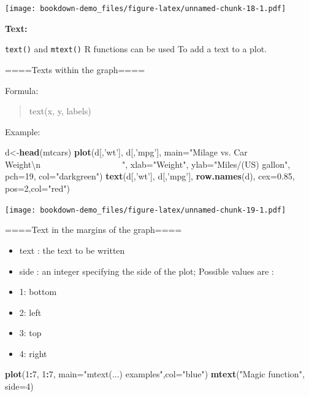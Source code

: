 \documentclass[]{book}
\newenvironment{Shaded}{\begin{snugshade}}{\end{snugshade}}
\newcommand{\KeywordTok}[1]{\textcolor[rgb]{0.13,0.29,0.53}{\textbf{#1}}}
\newcommand{\DataTypeTok}[1]{\textcolor[rgb]{0.13,0.29,0.53}{#1}}
\newcommand{\DecValTok}[1]{\textcolor[rgb]{0.00,0.00,0.81}{#1}}
\newcommand{\FloatTok}[1]{\textcolor[rgb]{0.00,0.00,0.81}{#1}}
\newcommand{\CharTok}[1]{\textcolor[rgb]{0.31,0.60,0.02}{#1}}
\newcommand{\StringTok}[1]{\textcolor[rgb]{0.31,0.60,0.02}{#1}}
\newcommand{\OperatorTok}[1]{\textcolor[rgb]{0.81,0.36,0.00}{\textbf{#1}}}
\newcommand{\NormalTok}[1]{#1}
\providecommand{\tightlist}{%
  \setlength{\itemsep}{0pt}\setlength{\parskip}{0pt}}
\begin{document}
\texttt{[image: bookdown-demo\_files/figure-latex/unnamed-chunk-18-1.pdf]}

\textbf{Text: }

\texttt{text()} and \texttt{mtext()} R functions can be used To add a
text to a plot.

====Texts within the graph====

Formula:

\begin{quote}
text(x, y, labels)
\end{quote}

Example:

\begin{Shaded}
\begin{Highlighting}[]
\NormalTok{d<-}\KeywordTok{head}\NormalTok{(mtcars)}
\KeywordTok{plot}\NormalTok{(d[,}\StringTok{'wt'}\NormalTok{], d[,}\StringTok{'mpg'}\NormalTok{], }
     \DataTypeTok{main=}\StringTok{"Milage vs. Car Weight}\CharTok{\textbackslash{}n}\StringTok{~~~~~~~~~~~~~~~~~~~"}\NormalTok{,}
      \DataTypeTok{xlab=}\StringTok{"Weight"}\NormalTok{, }\DataTypeTok{ylab=}\StringTok{"Miles/(US) gallon"}\NormalTok{,}
      \DataTypeTok{pch=}\DecValTok{19}\NormalTok{, }\DataTypeTok{col=}\StringTok{"darkgreen"}\NormalTok{)}
\KeywordTok{text}\NormalTok{(d[,}\StringTok{'wt'}\NormalTok{], d[,}\StringTok{'mpg'}\NormalTok{],  }\KeywordTok{row.names}\NormalTok{(d),}
     \DataTypeTok{cex=}\FloatTok{0.85}\NormalTok{, }\DataTypeTok{pos=}\DecValTok{2}\NormalTok{,}\DataTypeTok{col=}\StringTok{"red"}\NormalTok{)}
\end{Highlighting}
\end{Shaded}

\texttt{[image: bookdown-demo\_files/figure-latex/unnamed-chunk-19-1.pdf]}

====Text in the margins of the graph====

\begin{itemize}
\tightlist
\item
  text : the text to be written
\item
  side : an integer specifying the side of the plot; Possible values are
  :
\item
  1: bottom
\item
  2: left
\item
  3: top
\item
  4: right
\end{itemize}

\begin{Shaded}
\begin{Highlighting}[]
\KeywordTok{plot}\NormalTok{(}\DecValTok{1}\OperatorTok{:}\DecValTok{7}\NormalTok{, }\DecValTok{1}\OperatorTok{:}\DecValTok{7}\NormalTok{, }
     \DataTypeTok{main=}\StringTok{"mtext(...) examples"}\NormalTok{,}\DataTypeTok{col=}\StringTok{"blue"}\NormalTok{)}
\KeywordTok{mtext}\NormalTok{(}\StringTok{"Magic function"}\NormalTok{, }\DataTypeTok{side=}\DecValTok{4}\NormalTok{)}
\end{Highlighting}
\end{Shaded}
\end{document}
